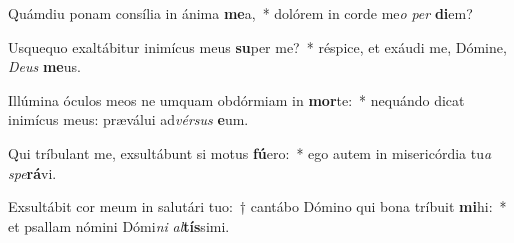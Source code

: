 \item Quámdiu ponam consília in ánima \textbf{me}a,~* dolórem in corde me\textit{o} \textit{per} \textbf{di}em?
\item Usquequo exaltábitur inimícus meus \textbf{su}per me?~* réspice, et exáudi me, Dómine, \textit{De}\textit{us} \textbf{me}us.
\item Illúmina óculos meos ne umquam obdórmiam in \textbf{mor}te:~* nequándo dicat inimícus meus: præválui ad\textit{vér}\textit{sus} \textbf{e}um.
\item Qui tríbulant me, exsultábunt si motus \textbf{fú}ero:~* ego autem in misericórdia tu\textit{a} \textit{spe}\textbf{rá}vi.
\item Exsultábit cor meum in salutári tuo:~† cantábo Dómino qui bona tríbuit \textbf{mi}hi:~* et psallam nómini Dómi\textit{ni} \textit{al}\textbf{tís}simi.
